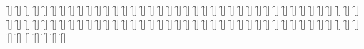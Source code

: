 \begin{questions}
\begin{multicols}{2}
        \question  \f[]
        \question  \f[]
        \question  \f[]
        \question  \f[]
        \question  \f[]
        \question  \f[]
        \question  \f[]
        \question  \f[]
        \question  \f[]
        \question  \f[]
        \question  \f[]
        \question  \f[]
        \question  \f[]
        \question  \f[]
        \question  \f[]
        \question  \f[]
        \question  \f[]
        \question  \f[]
        \question  \f[]
        \question  \f[]
        \question  \f[]
        \question  \f[]
        \question  \f[]
        \question  \f[]
        \question  \f[]
        \question  \f[]
        \question  \f[]
        \question  \f[]
        \question  \f[]
        \question  \f[]
        \question  \f[]
        \question  \f[]
        \question  \f[]
        \question  \f[]
        \question  \f[]
        \question  \f[]
        \question  \f[]
        \question  \f[]
        \question  \f[]
        \question  \f[]
        \question  \f[]
        \question  \f[]
        \question  \f[]
        \question  \f[]
        \question  \f[]
        \question  \f[]
        \question  \f[]
        \question  \f[]
        \question  \f[]
        \question  \f[]
        \question  \f[]
        \question  \f[]
        \question  \f[]
        \question  \f[]
        \question  \f[]
        \question  \f[]
        \question  \f[]
        \question  \f[]
        \question  \f[]
        \question  \f[]
        \question  \f[]
        \question  \f[]
        \question  \f[]
        \question  \f[]
        \question  \f[]
        \question  \f[]
        \question  \f[]
        \question  \f[]
        \question  \f[]
        \question  \f[]
        \question  \f[]
        \question  \f[]
        \question  \f[]
        \question  \f[]
        \question  \f[]
        \question  \f[]
        \question  \f[]
        \question  \f[]
        \question  \f[]
        \question  \f[]
        \question  \f[]
        \question  \f[]
        \question  \f[]
        \question  \f[]
        \question  \f[]
        \question  \f[]
        \question  \f[]
    \end{multicols}
\end{questions}
